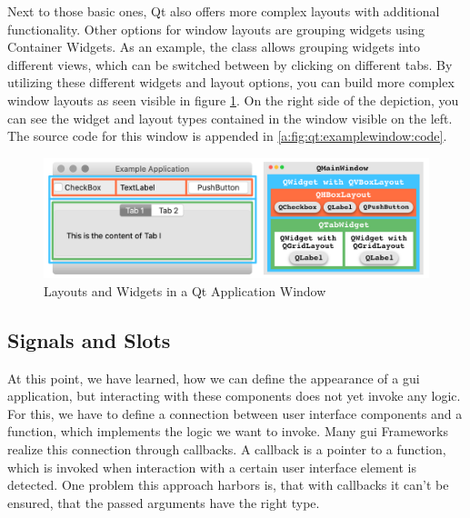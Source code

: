 Next to those basic ones, Qt also offers more complex layouts with additional
functionality. Other options for window layouts are grouping widgets using
Container Widgets. As an example, the class
 allows grouping widgets into different
views, which can be switched between by clicking on different tabs. By utilizing
these different widgets and layout options, you can build more complex window
layouts as seen visible in figure \ref{fig:qt:examplewindow}. On the
right side of the depiction, you can see the widget and layout types contained in
the window visible on the left. The source code for this window is
appended in \ref{a:fig:qt:examplewindow:code}. 
\cite{PythonGui1}

\begin{figure}[h]
    \centering
    \includegraphics[width=15cm]{resources/img/QtExample}
    \caption{Layouts and Widgets in a Qt Application Window}
    \label{fig:qt:examplewindow}
\end{figure}



\subsection{Signals and Slots}
\label{sec:fundamentals:qt:signalsslots}

At this point, we have learned, how we can define the appearance of a \gls{gui}
application, but interacting with these components does not yet invoke any
logic. For this, we have to define a connection between user interface
components and a function, which implements the logic we want to invoke. Many
\gls{gui} Frameworks realize this connection through callbacks. A callback is a
pointer to a function, which is invoked when interaction with a certain user
interface element is detected. One problem this approach harbors is, that with
callbacks it can't be ensured, that the passed arguments have the right type.

